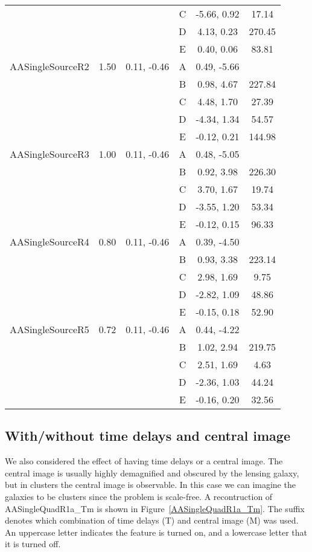 \documentclass[onecolumn,galley]{mn2e}
\newcommand{\figref}[1] {Figure~\ref{#1}}
\begin{document}
\begin{table}
\begin{tabular}{lccccc}
 & & & C & -5.66, 0.92 & 17.14\\
 & & & D & 4.13, 0.23 & 270.45\\
 & & & E & 0.40, 0.06 & 83.81\\
AASingleSourceR2 & 1.50 & 0.11, -0.46 & A & 0.49, -5.66 & \\
 & & & B & 0.98, 4.67 & 227.84\\
 & & & C & 4.48, 1.70 & 27.39\\
 & & & D & -4.34, 1.34 & 54.57\\
 & & & E & -0.12, 0.21 & 144.98\\
AASingleSourceR3 & 1.00 & 0.11, -0.46 & A & 0.48, -5.05 & \\
 & & & B & 0.92, 3.98 & 226.30\\
 & & & C & 3.70, 1.67 & 19.74\\
 & & & D & -3.55, 1.20 & 53.34\\
 & & & E & -0.12, 0.15 & 96.33\\
AASingleSourceR4 & 0.80 & 0.11, -0.46 & A & 0.39, -4.50 & \\
 & & & B & 0.93, 3.38 & 223.14\\
 & & & C & 2.98, 1.69 & 9.75\\
 & & & D & -2.82, 1.09 & 48.86\\
 & & & E & -0.15, 0.18 & 52.90\\
AASingleSourceR5 & 0.72 & 0.11, -0.46 & A & 0.44, -4.22 & \\
 & & & B & 1.02, 2.94 & 219.75\\
 & & & C & 2.51, 1.69 & 4.63\\
 & & & D & -2.36, 1.03 & 44.24\\
 & & & E & -0.16, 0.20 & 32.56
\end{tabular}
\end{table}


\subsection{With/without time delays and central image} %

We also considered the effect of having time delays or a central image. The
central image is usually highly demagnified and obscured by the lensing galaxy,
but in clusters the central image is observable. In this case we can imagine
the galaxies to be clusters since the problem is scale-free. A recontruction of
AASingleQuadR1a\_Tm is shown in \figref{AASingleQuadR1a_Tm}. The suffix denotes
which combination of time delays (T) and central image (M) was used. An
uppercase letter indicates the feature is turned on, and a lowercase letter
that it is turned off.
\end{document}
